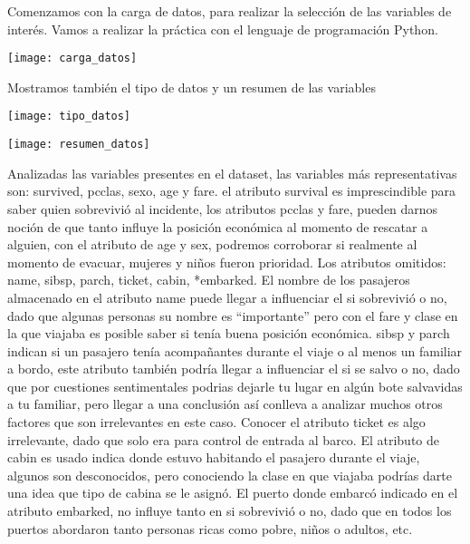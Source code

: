 \documentclass[12pt]{article}
\begin{document}
Comenzamos con la carga de datos, para realizar la selección de las variables de interés. Vamos a realizar la práctica con el lenguaje de programación Python.

\label{imagen}
  	\begin{center}
  	\texttt{[image: carga\_datos]}
\end{center}

Mostramos también el tipo de datos y un resumen de las variables

\label{imagen}
  	\begin{center}
  	\texttt{[image: tipo\_datos]}
\end{center}

\label{imagen}
  	\begin{center}
  	\texttt{[image: resumen\_datos]}
\end{center}


Analizadas las variables presentes en el dataset, las variables más representativas son: survived, pcclas, sexo, age y fare. el atributo survival es imprescindible para saber quien sobrevivió al incidente, los atributos pcclas y fare, pueden darnos noción de que tanto influye la posición económica al momento de rescatar a alguien, con el atributo de age y sex, podremos corroborar si realmente al momento de evacuar, mujeres y niños fueron prioridad. Los atributos omitidos: name, sibsp, parch, ticket, cabin, *embarked. El nombre de los pasajeros almacenado en el atributo name puede llegar a influenciar el si sobrevivió o no, dado que algunas personas su nombre es “importante” pero con el fare y clase en la que viajaba es posible saber si tenía buena posición económica. sibsp y parch indican si un pasajero tenía acompañantes durante el viaje o al menos un familiar a bordo, este atributo también podría llegar a influenciar el si se salvo o no, dado que por cuestiones sentimentales podrias dejarle tu lugar en algún bote salvavidas a tu familiar, pero llegar a una conclusión así conlleva a analizar muchos otros factores que son irrelevantes en este caso. Conocer el atributo ticket es algo irrelevante, dado que solo era para control de entrada al barco. El atributo de cabin es usado indica donde estuvo habitando el pasajero durante el viaje, algunos son desconocidos, pero conociendo la clase en que viajaba podrías darte una idea que tipo de cabina se le asignó. El puerto donde embarcó indicado en el atributo embarked, no influye tanto en si sobrevivió o no, dado que en todos los puertos abordaron tanto personas ricas como pobre, niños o adultos, etc.
\end{document}
